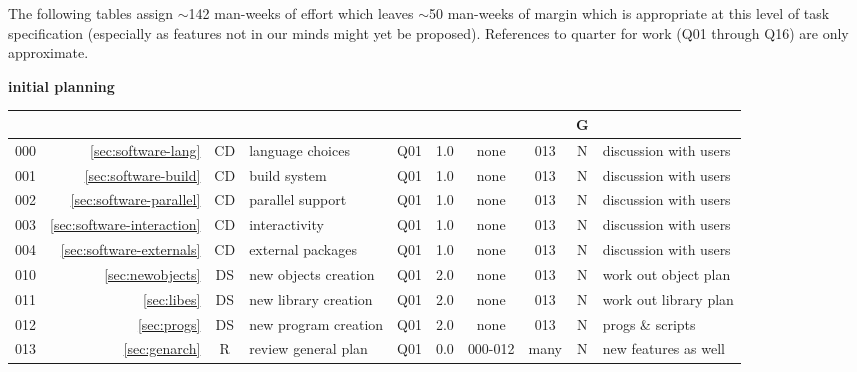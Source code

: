 The following tables assign $\sim$142 man-weeks of effort which leaves $\sim$50 man-weeks of margin
which is appropriate at this level of task specification (especially as features not in our minds
might yet be proposed).  References to quarter for work (Q01 through Q16) are only approximate.

\small
\textbf{initial planning}\hfill\break
\noindent
\begin{tabular}{r|r|c|l|c|c|c|c|c|l}
\hline
\usebox{\NM}&\usebox{\REF}&\usebox{\WW}&\usebox{\TPC}&\usebox{\ST}&\usebox{\EFF}&\usebox{\PRD}&\usebox{\SCC}&G&\usebox{\CMTS}\\
\hline
\hline
000&\ref{sec:software-lang}        &CD& language choices     & Q01 & 1.0 & none    &  013 & N & discussion with users\\
001&\ref{sec:software-build}       &CD& build system         & Q01 & 1.0 & none    &  013 & N & discussion with users\\
002&\ref{sec:software-parallel}    &CD& parallel support     & Q01 & 1.0 & none    &  013 & N & discussion with users\\
003&\ref{sec:software-interaction} &CD& interactivity        & Q01 & 1.0 & none    &  013 & N & discussion with users\\
004&\ref{sec:software-externals}   &CD& external packages    & Q01 & 1.0 & none    &  013 & N & discussion with users\\
010&\ref{sec:newobjects}           &DS& new objects creation & Q01 & 2.0 & none    &  013 & N & work out object plan \\
011&\ref{sec:libes}                &DS& new library creation & Q01 & 2.0 & none    &  013 & N & work out library plan \\
012&\ref{sec:progs}                &DS& new program creation & Q01 & 2.0 & none    &  013 & N & progs \& scripts \\
013&\ref{sec:genarch}              &R & review general plan  & Q01 & 0.0 & 000-012 & many & N & new features as well\\
\hline
\end{tabular}\vspace{6mm}

